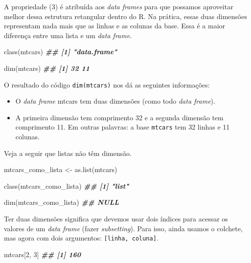 \documentclass[
]{book}
\newenvironment{Shaded}{\begin{snugshade}}{\end{snugshade}}
\newcommand{\DecValTok}[1]{\textcolor[rgb]{0.00,0.00,0.81}{#1}}
\newcommand{\DocumentationTok}[1]{\textcolor[rgb]{0.56,0.35,0.01}{\textbf{\textit{#1}}}}
\newcommand{\FunctionTok}[1]{\textcolor[rgb]{0.00,0.00,0.00}{#1}}
\newcommand{\NormalTok}[1]{#1}
\newcommand{\OtherTok}[1]{\textcolor[rgb]{0.56,0.35,0.01}{#1}}
\begin{document}
A propriedade (3) é atribuída aos \emph{data frames} para que possamos aproveitar melhor dessa estrutura retangular dentro do R. Na prática, essas duas dimensões representam nada mais que as linhas e as colunas da base. Essa é a maior diferença entre uma lista e um \emph{data frame}.

\begin{Shaded}
\begin{Highlighting}[]
\FunctionTok{class}\NormalTok{(mtcars)}
\DocumentationTok{\#\# [1] "data.frame"}

\FunctionTok{dim}\NormalTok{(mtcars)}
\DocumentationTok{\#\# [1] 32 11}
\end{Highlighting}
\end{Shaded}

O resultado do código \texttt{dim(mtcars)} nos dá as seguintes informações:

\begin{itemize}
\item
  O \emph{data frame} mtcars tem duas dimensões (como todo \emph{data frame}).
\item
  A primeira dimensão tem comprimento 32 e a segunda dimensão tem comprimento 11. Em outras palavras: a base \texttt{mtcars} tem 32 linhas e 11 colunas.
\end{itemize}

Veja a seguir que listas não têm dimensão.

\begin{Shaded}
\begin{Highlighting}[]
\NormalTok{mtcars\_como\_lista }\OtherTok{\textless{}{-}} \FunctionTok{as.list}\NormalTok{(mtcars)}

\FunctionTok{class}\NormalTok{(mtcars\_como\_lista)}
\DocumentationTok{\#\# [1] "list"}

\FunctionTok{dim}\NormalTok{(mtcars\_como\_lista)}
\DocumentationTok{\#\# NULL}
\end{Highlighting}
\end{Shaded}

Ter duas dimensões significa que devemos usar dois índices para acessar os valores de um \emph{data frame} (fazer \emph{subsetting}). Para isso, ainda usamos o colchete, mas agora com dois argumentos: \texttt{{[}linha,\ coluna{]}}.

\begin{Shaded}
\begin{Highlighting}[]
\NormalTok{mtcars[}\DecValTok{2}\NormalTok{, }\DecValTok{3}\NormalTok{]}
\DocumentationTok{\#\# [1] 160}
\end{Highlighting}
\end{Shaded}
\end{document}
